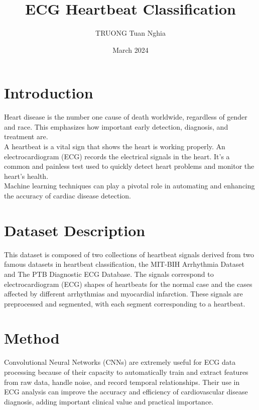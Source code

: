 \documentclass[conference]{article}
\title{ECG Heartbeat Classification}
\author{TRUONG Tuan Nghia}
\date{March 2024}
\begin{document}
\maketitle

\section{Introduction}

Heart disease is the number one cause of death worldwide, regardless of gender and race. This emphasizes how important early detection, diagnosis, and treatment are. \\


A heartbeat is a vital sign that shows the heart is working properly. An electrocardiogram (ECG) records the electrical signals in the heart. It's a common and painless test used to quickly detect heart problems and monitor the heart's health. \\

Machine learning techniques can play a pivotal role in automating and enhancing the accuracy of cardiac disease detection. \\

\section{Dataset Description}

This dataset is composed of two collections of heartbeat signals derived from two famous datasets in heartbeat classification, the MIT-BIH Arrhythmia Dataset and The PTB Diagnostic ECG Database. The signals correspond to electrocardiogram (ECG) shapes of heartbeats for the normal case and the cases affected by different arrhythmias and myocardial infarction. These signals are preprocessed and segmented, with each segment corresponding to a heartbeat.


\section{Method}

Convolutional Neural Networks (CNNs) are extremely useful for ECG data processing because of their capacity to automatically train and extract features from raw data, handle noise, and record temporal relationships. Their use in ECG analysis can improve the accuracy and efficiency of cardiovascular disease diagnosis, adding important clinical value and practical importance. \\
\end{document}

